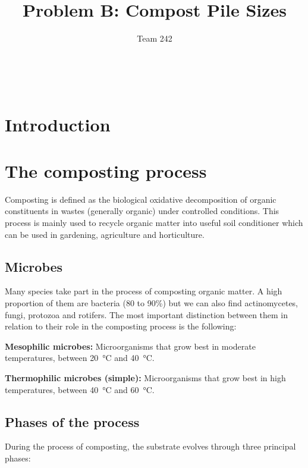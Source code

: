\documentclass[12pt, a4paper, twocolumn]{article}
\title{\sffamily \bfseries Problem B: Compost Pile Sizes}
\author{\sffamily Team 242}
\date{}
\numberwithin{table}{section}
\numberwithin{figure}{section}
\numberwithin{equation}{section}
\begin{document}
\renewcommand{\abstractname}{}
\renewcommand{\absnamepos}{empty}
\begin{titlingpage}
 \maketitle

\noindent \hrulefill \\
\begin{abstract}

\end{abstract}
\hrulefill
\end{titlingpage}

\begin{titlingpage}
\tableofcontents
\end{titlingpage}

\section{Introduction}
\cite{mason}

\section{The composting process}
Composting is defined as the biological oxidative decomposition of organic constituents in wastes (generally organic) under controlled conditions. This process is mainly used to recycle organic matter into useful soil conditioner which can be used in gardening, agriculture and horticulture.

\subsection{Microbes}
Many species take part in the process of composting organic matter. A high proportion of them are bacteria (80 to 90\%) but we can also find actinomycetes, fungi, protozoa and rotifers. The most important distinction between them in relation to their role in the composting process is the following:

\textbf{Mesophilic microbes:} Microorganisms that grow best in moderate temperatures, between \SI{20}{\celsius} and \SI{40}{\celsius}.

\textbf{Thermophilic microbes (simple):} Microorganisms that grow best in high temperatures, between \SI{40}{\celsius} and \SI{60}{\celsius}.

\subsection{Phases of the process}
During the process of composting, the substrate evolves through three principal phases:
\end{document}
